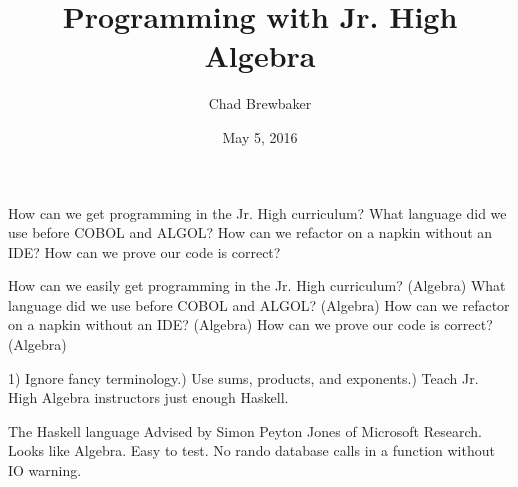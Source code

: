 \documentclass{beamer}
\title{Programming with Jr. High Algebra}
\author{Chad Brewbaker}
\date{May 5, 2016}
\begin{document}
\frame{\titlepage}


%

\begin{frame}[fragile]
How can we get programming in the Jr. High curriculum?\newline
\newline
What language did we use before COBOL and ALGOL?\newline
\newline
How can we refactor on a napkin without an IDE?\newline
\newline
How can we prove our code is correct?

\end{frame}


\begin{frame}[fragile]
How can we easily get programming in the Jr. High curriculum?\newline
(Algebra)\newline
What language did we use before COBOL and ALGOL?\newline
(Algebra)\newline
How can we refactor on a napkin without an IDE?\newline
(Algebra)\newline
How can we prove our code is correct?\newline
(Algebra)
\end{frame}


\begin{frame}[fragile]
1) Ignore fancy terminology.\newline{}) Use sums, products, and exponents.\newline{}) Teach Jr. High Algebra instructors just enough Haskell.  
\end{frame}


\begin{frame}[fragile]
The Haskell language\newline\newline
Advised by Simon Peyton Jones of Microsoft Research.\newline\newline
Looks like Algebra. \newline\newline
Easy to test. No rando database calls in a function without IO warning.
\end{frame}
\end{document}
